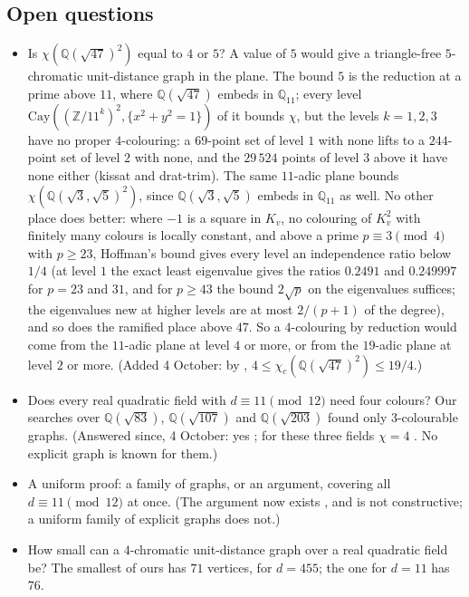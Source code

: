 \documentclass[11pt,a4paper]{amsart}
\theoremstyle{remark}
\newcommand{\Q}{\mathbb{Q}}
\newcommand{\Z}{\mathbb{Z}}
\begin{document}
\subsection*{Open questions}
\begin{itemize}
\item Is $\chi(\Q(\sqrt{47})^2)$ equal to $4$ or $5$? A value of $5$ would give a triangle-free $5$-chromatic
  unit-distance graph in the plane. The bound $5$ is the reduction at a prime above $11$, where $\Q(\sqrt{47})$
  embeds in $\Q_{11}$; every level $\mathrm{Cay}((\Z/11^k)^2,\{x^2+y^2=1\})$ of it bounds $\chi$, but the levels
  $k=1,2,3$ have no proper $4$-colouring: a $69$-point set of level $1$ with none lifts to a $244$-point set of
  level $2$ with none, and the $29\,524$ points of level $3$ above it have none either (kissat and drat-trim). The same $11$-adic plane bounds $\chi(\Q(\sqrt3,\sqrt5)^2)$, since $\Q(\sqrt3,\sqrt5)$
  embeds in $\Q_{11}$ as well. No other place does better: where $-1$ is a square in $K_v$, no colouring of
  $K_v^2$ with finitely many colours is locally constant, and above a prime $p\equiv3\pmod4$ with $p\ge23$,
  Hoffman's bound gives every level an independence ratio below $1/4$ (at level $1$ the exact least eigenvalue
  gives the ratios $0.2491$ and $0.249997$ for $p=23$ and $31$, and for $p\ge43$ the bound $2\sqrt p$ on the
  eigenvalues \cite{MMST} suffices; the eigenvalues new at higher levels are at most $2/(p+1)$ of the degree), and
  so does the ramified place above $47$. So a $4$-colouring by reduction would come from the $11$-adic plane at level $4$ or
  more, or from the $19$-adic plane at level $2$ or more. (Added 4 October: by \cite{TCol},
  $4\le\chi_c(\Q(\sqrt{47})^2)\le19/4$.)
\item Does every real quadratic field with $d\equiv11\pmod{12}$ need four colours? Our searches over
  $\Q(\sqrt{83})$, $\Q(\sqrt{107})$ and $\Q(\sqrt{203})$ found only $3$-colourable graphs. (Answered since,
  4 October: yes \cite{FC}; for these three fields $\chi=4$ \cite{Winding}. No explicit graph is known for them.)
\item A uniform proof: a family of graphs, or an argument, covering all $d\equiv11\pmod{12}$ at once. (The argument
  now exists \cite{FC}, and is not constructive; a uniform family of explicit graphs does not.)
\item How small can a $4$-chromatic unit-distance graph over a real quadratic field be? The smallest of ours
  has $71$ vertices, for $d=455$; the one for $d=11$ has $76$.
\end{itemize}
\end{document}
